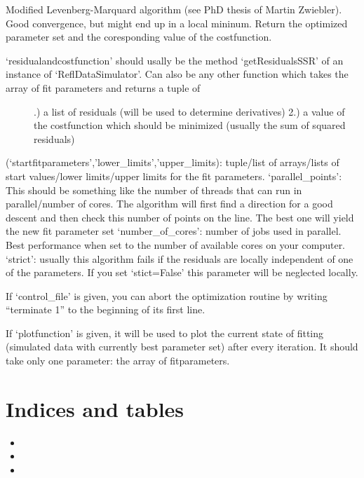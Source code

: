 \documentclass[letterpaper,10pt,english]{sphinxmanual}
\begin{document}

\begin{fulllineitems}
\label{\detokenize{modules-api/fitters:Fitters.Levenberg_Marquardt_Fitter}}
Modified Levenberg-Marquard algorithm (see PhD thesis of Martin Zwiebler). Good convergence, but might end up in a local mininum.
Return the optimized parameter set and the coresponding value of the costfunction.
\begin{description}
\item[{‘residualandcostfunction’ should usally be the method ‘getResidualsSSR’ of an instance of ‘ReflDataSimulator’. Can also be any other function which takes the array of fit parameters and returns a tuple of }] .) a list of residuals (will be used to determine derivatives) 2.) a value of the costfunction which should be minimized (usually the sum of squared residuals)

\end{description}

(‘startfitparameters’,’lower\_limits’,’upper\_limits): tuple/list of arrays/lists of start values/lower limits/upper limits for the fit parameters.
‘parallel\_points’: This should be something like the number of threads that can run in parallel/number of cores. The algorithm will first find a direction for a good descent and then check this number of points on the line. The best one will yield the new fit parameter set
‘number\_of\_cores’: number of jobs used in parallel. Best performance when set to the number of available cores on your computer.
‘strict’: usually this algorithm fails if the residuals are locally independent of one of the parameters. If you set ‘stict=False’ this parameter will be neglected locally.

If ‘control\_file’ is given, you can abort the optimization routine by writing “terminate 1” to the beginning of its first line.

If ‘plotfunction’ is given, it will be used to plot the current state of fitting (simulated data with currently best parameter set) after every iteration. It should take only one parameter: the array of fitparameters.

\end{fulllineitems}



\chapter{Indices and tables}
\label{\detokenize{index:indices-and-tables}}\begin{itemize}
\item {} 

\item {} 

\item {} 

\end{itemize}
\end{document}

